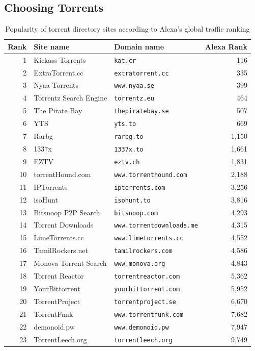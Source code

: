 \documentclass[10pt, a4paper]{scrartcl} %
\renewcommand{\_}{\origunderscore\allowbreak}
\begin{document}
\subsection{Choosing Torrents}
\begin{table}
\centering
\begin{tabular}{rllr}
\toprule
Rank & Site name & Domain name & Alexa Rank \\
\midrule
1 & Kickass Torrents & \texttt{kat.cr} & 116 \\
2 & ExtraTorrent.cc & \texttt{extratorrent.cc} & 335 \\
3 & Nyaa Torrents & \texttt{www.nyaa.se} & 399 \\
4 & Torrentz Search Engine & \texttt{torrentz.eu} & 464 \\
5 & The Pirate Bay & \texttt{thepiratebay.se} & 507 \\
6 & YTS & \texttt{yts.to} & 669 \\
7 & Rarbg & \texttt{rarbg.to} & 1,150 \\
8 & 1337x & \texttt{1337x.to} & 1,661 \\
9 & EZTV & \texttt{eztv.ch} & 1,831 \\
10 & torrentHound.com & \texttt{www.torrenthound.com} & 2,188 \\
11 & IPTorrents & \texttt{iptorrents.com} & 3,256 \\
12 & isoHunt & \texttt{isohunt.to} & 3,816 \\
13 & Bitsnoop P2P Search & \texttt{bitsnoop.com} & 4,293 \\
14 & Torrent Downloads & \texttt{www.torrentdownloads.me} & 4,315 \\
15 & LimeTorrents.cc & \texttt{www.limetorrents.cc} & 4,552 \\
16 & TamilRockers.net & \texttt{tamilrockers.com} & 4,586 \\
17 & Monova Torrent Search & \texttt{www.monova.org} & 4,843 \\
18 & Torrent Reactor & \texttt{torrentreactor.com} & 5,362 \\
19 & YourBittorrent & \texttt{yourbittorrent.com} & 5,952 \\
20 & TorrentProject & \texttt{torrentproject.se} & 6,670 \\
21 & TorrentFunk & \texttt{www.torrentfunk.com} & 7,682 \\
22 & demonoid.pw & \texttt{www.demonoid.pw} & 7,947 \\
23 & TorrentLeech.org & \texttt{torrentleech.org} & 9,749 \\
\bottomrule
\end{tabular}
\caption{Popularity of torrent directory sites according to Alexa's global traffic ranking}
\label{torrentsites}
\end{table}
\end{document}
